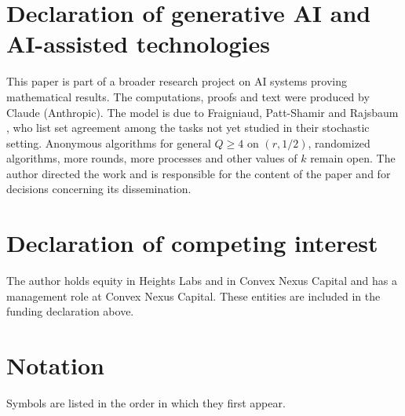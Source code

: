 \documentclass[11pt]{article}
\theoremstyle{remark}
\begin{document}
\section*{Declaration of generative AI and AI-assisted technologies}
This paper is part of a broader research project on AI systems proving mathematical results. The computations, proofs and text were produced by Claude (Anthropic). The model is due to Fraigniaud, Patt-Shamir and Rajsbaum \cite{FPR}, who list set agreement among the tasks not yet studied in their stochastic setting. Anonymous algorithms for general $Q\ge4$ on $(r,1/2)$, randomized algorithms, more rounds, more processes and other values of $k$ remain open. The author directed the work and is responsible for the content of the paper and for decisions concerning its dissemination.

\section*{Declaration of competing interest}
The author holds equity in Heights Labs and in Convex Nexus Capital and has a management role at Convex Nexus Capital. These entities are included in the funding declaration above.

\appendix
\section{Notation}\label{app:notation}
Symbols are listed in the order in which they first appear.
\end{document}

